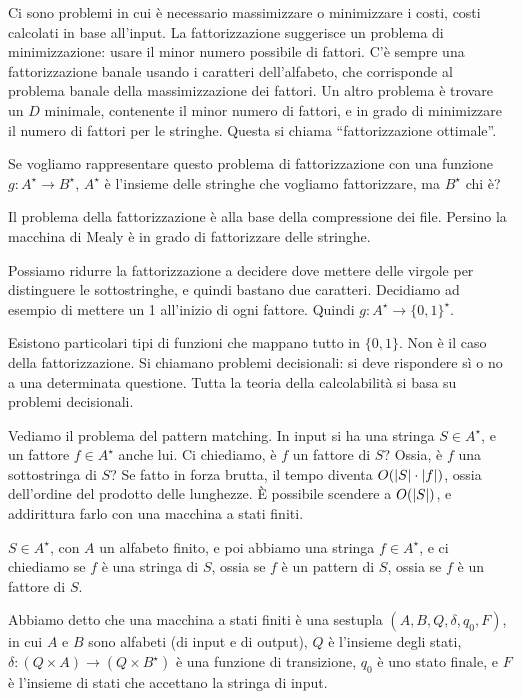 Ci sono problemi in cui \`e necessario massimizzare o minimizzare i costi, costi calcolati in base all'input. La fattorizzazione suggerisce un problema di minimizzazione: usare il minor numero possibile di fattori. C'\`e sempre una fattorizzazione banale usando i caratteri dell'alfabeto, che corrisponde al problema banale della massimizzazione dei fattori. Un altro problema \`e trovare un $D$ minimale, contenente il minor numero di fattori, e in grado di minimizzare il numero di fattori per le stringhe. Questa si chiama ``fattorizzazione ottimale''.

Se vogliamo rappresentare questo problema di fattorizzazione con una funzione $g : A^{\star} \to B^{\star}$, $A^{\star}$ \`e l'insieme delle stringhe che vogliamo fattorizzare, ma $B^{\star}$ chi \`e?

Il problema della fattorizzazione \`e alla base della compressione dei file. Persino la macchina di Mealy \`e in grado di fattorizzare delle stringhe.

Possiamo ridurre la fattorizzazione a decidere dove mettere delle virgole per distinguere le sottostringhe, e quindi bastano due caratteri. Decidiamo ad esempio di mettere un 1 all'inizio di ogni fattore. Quindi $g : A^{\star} \to \{ 0,1 \}^{\star}$.

Esistono particolari tipi di funzioni che mappano tutto in $\{ 0, 1\}$. Non \`e il caso della fattorizzazione. Si chiamano problemi decisionali: si deve rispondere s\`i o no a una determinata questione. Tutta la teoria della calcolabilit\`a si basa su problemi decisionali.

Vediamo il problema del pattern matching. In input si ha una stringa $S \in A^{\star}$, e un fattore $f \in A^{\star}$ anche lui. Ci chiediamo, \`e $f$ un fattore di $S$? Ossia, \`e $f$ una sottostringa di $S$? Se fatto in forza brutta, il tempo diventa $O(\left\lvert{S}\right\rvert \cdot \left\lvert{f}\right\rvert)$, ossia dell'ordine del prodotto delle lunghezze. \`E possibile scendere a $O(\left\lvert{S}\right\rvert)$, e addirittura farlo con una macchina a stati finiti.

$S \in A^{\star}$, con $A$ un alfabeto finito, e poi abbiamo una stringa $f \in A^{\star}$, e ci chiediamo se $f$ \`e una stringa di $S$, ossia se $f$ \`e un pattern di $S$, ossia se $f$ \`e un fattore di $S$. 

Abbiamo detto che una macchina a stati finiti \`e una sestupla $(A, B, Q, \delta, q_0, F)$, in cui $A$ e $B$ sono alfabeti (di input e di output), $Q$ \`e l'insieme degli stati, $\delta : (Q \times A) \to (Q \times B^{\star})$ \`e una funzione di transizione, $q_0$ \`e uno stato finale, e $F$ \`e l'insieme di stati che accettano la stringa di input.

